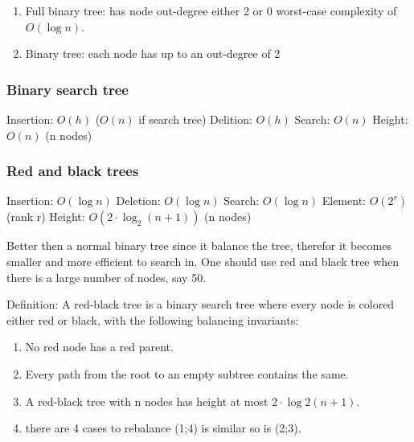 \begin{enumerate}
\item  Full binary tree: has node out-degree either 2 or 0
  worst-case complexity of $O(\log{n})$.
\item  Binary tree: each node has up to an out-degree of 2
\end{enumerate}

\subsubsection{Binary search tree}
Insertion: $O(h)$  ($O(n)$ if search tree) \newline 
Delition: $O(h)$                           \newline
Search: $O(n)$                             \newline
Height: $O(n)$ (n nodes)                   \newline


\newpage

\subsubsection{Red and black trees}
Insertion: $O(\log{n})$                    \newline %
Deletion: $O(\log{n})$                     \newline
Search: $O(\log{n})$                       \newline %
Element: $O(2^r)$  (rank r)                \newline %
Height: $O(2\cdot\log_{2}(n+1))$ (n nodes) \newline

Better then a normal binary tree since it balance the tree,
therefor it becomes smaller and more efficient to search in.
One should use red and black tree when there is a large number of nodes, say 50.

Definition: A red-black tree is a binary search tree where every node is
colored either red or black, with the following balancing invariants: 

\begin{enumerate}
\item  No red node has a red parent.
\item  Every path from the root to an empty subtree contains the same.
\item  A red-black tree with n nodes has height at most $2\cdot\log{2}(n+1)$.
\item  there are 4 cases to rebalance (1;4) is similar so is (2;3).
\end{enumerate}
\vspace{2mm}

